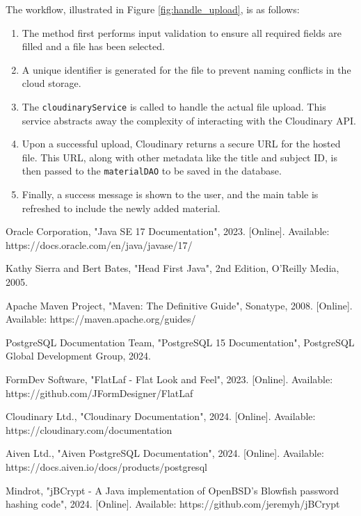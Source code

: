 \documentclass[12pt, a4paper]{report}
\begin{document}
The workflow, illustrated in Figure \ref{fig:handle_upload}, is as follows:
\begin{enumerate}
    \item The method first performs input validation to ensure all required fields are filled and a file has been selected.
    \item A unique identifier is generated for the file to prevent naming conflicts in the cloud storage.
    \item The \texttt{cloudinaryService} is called to handle the actual file upload. This service abstracts away the complexity of interacting with the Cloudinary API.
    \item Upon a successful upload, Cloudinary returns a secure URL for the hosted file. This URL, along with other metadata like the title and subject ID, is then passed to the \texttt{materialDAO} to be saved in the database.
    \item Finally, a success message is shown to the user, and the main table is refreshed to include the newly added material.
\end{enumerate}

\begin{thebibliography}{9}

Oracle Corporation, "Java SE 17 Documentation", 2023. [Online]. Available: https://docs.oracle.com/en/java/javase/17/

Kathy Sierra and Bert Bates, "Head First Java", 2nd Edition, O'Reilly Media, 2005.

Apache Maven Project, "Maven: The Definitive Guide", Sonatype, 2008. [Online]. Available: https://maven.apache.org/guides/

PostgreSQL Documentation Team, "PostgreSQL 15 Documentation", PostgreSQL Global Development Group, 2024.

FormDev Software, "FlatLaf - Flat Look and Feel", 2023. [Online]. Available: https://github.com/JFormDesigner/FlatLaf

Cloudinary Ltd., "Cloudinary Documentation", 2024. [Online]. Available: https://cloudinary.com/documentation

Aiven Ltd., "Aiven PostgreSQL Documentation", 2024. [Online]. Available: https://docs.aiven.io/docs/products/postgresql

Mindrot, "jBCrypt - A Java implementation of OpenBSD's Blowfish password hashing code", 2024. [Online]. Available: https://github.com/jeremyh/jBCrypt

\end{thebibliography}

\end{document}
